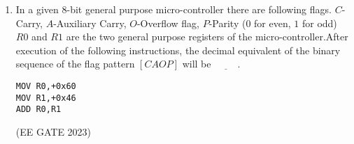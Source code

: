\begin{enumerate}
\item In a given $8$-bit general purpose micro-controller there are following flags. $C$-Carry, $A$-Auxiliary Carry, $O$-Overflow flag, $P$-Parity ($0$ for even, $1$ for odd) $R0$ and $R1$ are the two general purpose registers of the micro-controller.After execution of the following instructions, the decimal equivalent of the binary sequence of the flag pattern $[CAOP]$ will be $\underline{\hspace{1cm}}$.\\


\begin{lstlisting}
MOV R0,+0x60
MOV R1,+0x46 
ADD R0,R1
\end{lstlisting}
    
\hfill{(EE GATE 2023)}\\
\end{enumerate}
